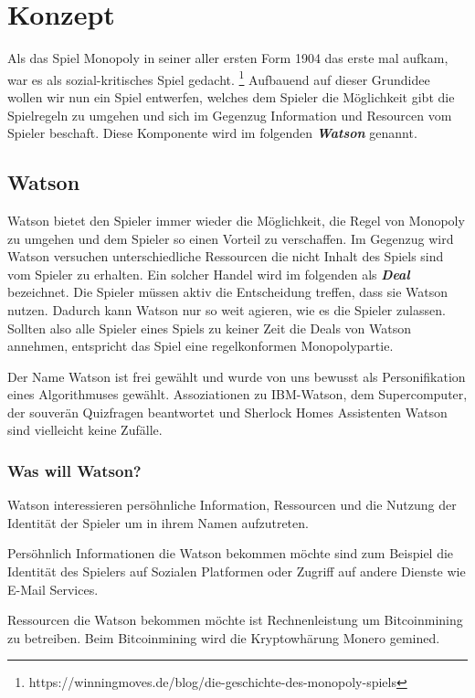 \documentclass[german]{cgspaper} %
\newcommand{\neuerBegriff}[1]{\textbf{\textit{#1}}}
\begin{document}
\section{Konzept}\label{sec:concept}

Als das Spiel Monopoly in seiner aller ersten Form 1904 das erste mal aufkam, war es als sozial-kritisches Spiel gedacht. \footnote{https://winningmoves.de/blog/die-geschichte-des-monopoly-spiels}
Aufbauend auf dieser Grundidee wollen wir nun ein Spiel entwerfen, welches dem Spieler die Möglichkeit gibt die Spielregeln zu umgehen und sich im Gegenzug Information und Resourcen vom Spieler beschaft. 
Diese Komponente wird im folgenden \neuerBegriff{Watson} genannt.

\subsection{Watson}

Watson bietet den Spieler immer wieder die Möglichkeit, die Regel von Monopoly zu umgehen und dem Spieler so einen Vorteil zu verschaffen.
Im Gegenzug wird Watson versuchen unterschiedliche Ressourcen die nicht Inhalt des Spiels sind vom Spieler zu erhalten.
Ein solcher Handel wird im folgenden als \neuerBegriff{Deal} bezeichnet.
Die Spieler müssen aktiv die Entscheidung treffen, dass sie Watson nutzen.
Dadurch kann Watson nur so weit agieren, wie es die Spieler zulassen.
Sollten also alle Spieler eines Spiels zu keiner Zeit die Deals von Watson annehmen, entspricht das Spiel eine regelkonformen Monopolypartie.

Der Name Watson ist frei gewählt und wurde von uns bewusst als Personifikation eines Algorithmuses gewählt. Assoziationen zu IBM-Watson, dem Supercomputer, der souverän Quizfragen beantwortet und Sherlock Homes Assistenten Watson sind vielleicht keine Zufälle.

\subsubsection{Was will Watson?}

Watson interessieren persöhnliche Information, Ressourcen und die Nutzung der Identität der Spieler um in ihrem Namen aufzutreten.

Persöhnlich Informationen die Watson bekommen möchte sind zum Beispiel die Identität des Spielers auf Sozialen Platformen oder Zugriff auf andere Dienste wie E-Mail Services.

Ressourcen die Watson bekommen möchte ist Rechnenleistung um Bitcoinmining zu betreiben.
Beim Bitcoinmining wird die Kryptowhärung Monero gemined.
\end{document}
